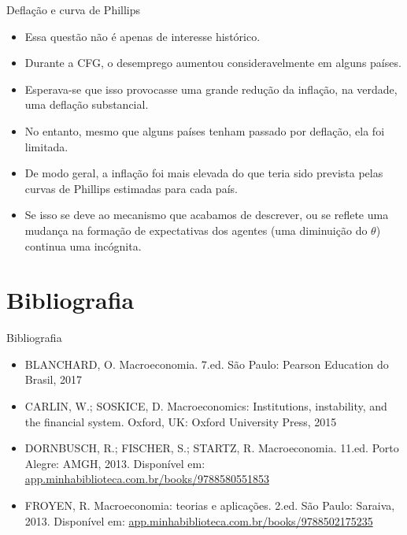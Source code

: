 \documentclass[10pt]{beamer}
\begin{document}
\begin{frame}{Deflação e curva de Phillips}
    \begin{itemize}
        \item Essa questão não é apenas de interesse histórico.
        \bigskip
        \item Durante a CFG, o desemprego aumentou consideravelmente em alguns países.
        \bigskip
        \item Esperava-se que isso provocasse uma grande redução da inflação, na verdade, uma deflação substancial.
        \bigskip
        \item No entanto, mesmo que alguns países tenham passado por deflação, ela foi limitada.
        \bigskip
        \item De modo geral, a inflação foi mais elevada do que teria sido prevista pelas curvas de Phillips estimadas para cada país.
        \bigskip
        \item Se isso se deve ao mecanismo que acabamos de descrever, ou se reflete uma mudança na formação de expectativas dos agentes (uma diminuição do $\theta$) continua uma incógnita.
    \end{itemize}
\end{frame}

\section{Bibliografia}
\begin{frame}{ Bibliografia}
    \begin{itemize}                
        \item BLANCHARD, O. Macroeconomia. 7.ed. São Paulo: Pearson Education do Brasil, 2017\medskip                
        \item CARLIN, W.; SOSKICE, D. Macroeconomics: Institutions, instability, and the financial system. Oxford, UK: Oxford University Press, 2015\medskip        
        \item DORNBUSCH, R.; FISCHER, S.; STARTZ, R. Macroeconomia. 11.ed. Porto Alegre: AMGH, 2013. Disponível em: \href{https://app.minhabiblioteca.com.br/books/9788580551853}{app.minhabiblioteca.com.br/books/9788580551853}\medskip
        \item FROYEN, R. Macroeconomia: teorias e aplicações. 2.ed. São Paulo: Saraiva, 2013. Disponível em: \href{https://app.minhabiblioteca.com.br/books/9788502175235}{app.minhabiblioteca.com.br/books/9788502175235}        
    \end{itemize}
\end{frame}
\end{document}
